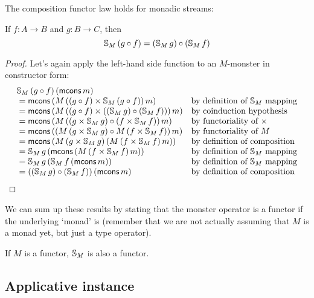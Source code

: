 \begin{lemma}\label{lemma:functor_comp}
The composition functor law holds for monadic streams:

If $f:A\rightarrow B$ and $g:B\rightarrow C$, then
$$
\mathbb{S}_{M}\,(g\circ f) = (\mathbb{S}_{M}\,g) \circ (\mathbb{S}_{M}\,f)
$$
\end{lemma}
\begin{proof}
Let's again apply the left-hand side function to an $M$-monster in constructor form:
$$
\begin{array}{ll}
\mathbb{S}_{M}\,(g\circ f)\,(\mathsf{mcons}\,m)\\
{}= \mathsf{mcons}\,(M\,((g\circ f)\times \mathbb{S}_{M}\,(g\circ f))\,m)
  & \mbox{by definition of }\mathbb{S}_{M}\mbox{ mapping}\\
{}= \mathsf{mcons}\,(M\,((g\circ f)\times ((\mathbb{S}_{M}\,g) \circ (\mathbb{S}_{M}\,f)))\,m)
  & \mbox{by coinduction hypothesis}\\ 
{}= \mathsf{mcons}\,(M\,((g\times \mathbb{S}_{M}\,g) \circ (f\times \mathbb{S}_{M}\,f))\,m)
  & \mbox{by functoriality of }\times\\ 
{}= \mathsf{mcons}\,((M\,(g\times \mathbb{S}_{M}\,g) \circ M\,(f\times \mathbb{S}_{M}\,f))\,m)
  & \mbox{by functoriality of }M\\ 
{}= \mathsf{mcons}\,(M\,(g\times \mathbb{S}_{M}\,g)\, (M\,(f\times \mathbb{S}_{M}\,f)\,m))
  & \mbox{by definition of composition}\\ 
{}= \mathbb{S}_{M}\,g\, (\mathsf{mcons}\,(M\,(f\times \mathbb{S}_{M}\,f)\,m))
  & \mbox{by definition of }\mathbb{S}_{M}\mbox{ mapping}\\ 
{}= \mathbb{S}_{M}\,g\, (\mathbb{S}_{M}\,f\,(\mathsf{mcons}\,m))
  & \mbox{by definition of }\mathbb{S}_{M}\mbox{ mapping}\\ 
{}= ((\mathbb{S}_{M}\,g) \circ (\mathbb{S}_{M}\,f))\,(\mathsf{mcons}\,m)
  & \mbox{by definition of composition}
\end{array}
$$
\end{proof}

We can sum up these results by stating that the monster operator is a functor if the underlying `monad' is (remember that we are not actually assuming that $M$ is a monad yet, but just a type operator).

\begin{theorem}
If $M$ is a functor, $\mathbb{S}_{M}$ is also a functor.
\end{theorem}

\subsection{Applicative instance}

